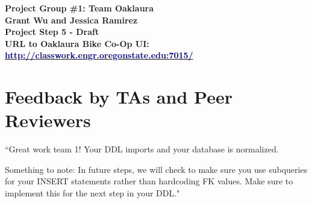 \documentclass{article}
\begin{document}
\begin{center}
\large\textcolor{primarycolor}{\textbf{Project Group \#1: Team Oaklaura}}\\[0.3cm]
\large\textbf{Grant Wu and Jessica Ramirez}\\[0.3cm]
\huge\textbf{Project Step 5 - Draft}\\[0.5cm]

\large\textbf{URL to Oaklaura Bike Co-Op UI:}\\[0.5cm]
\large\href{http://classwork.engr.oregonstate.edu:7015/}{\textcolor{darkblue}{\textbf{http://classwork.engr.oregonstate.edu:7015/}}}\\[1.25cm]
\end{center}
\section{Feedback by TAs and Peer Reviewers}
\begin{tcolorbox}[colback=secondarycolor, colframe=primarycolor, title=\textbf{Step 4: TA Review - Madelyn Lazar}]
``Great work team 1! Your DDL imports and your database is normalized. 

\vspace{0.2cm}
Something to note: In future steps, we will check to make sure you use subqueries for your INSERT statements rather than hardcoding FK values. Make sure to implement this for the next step in your DDL."
\end{tcolorbox}
\end{document}
